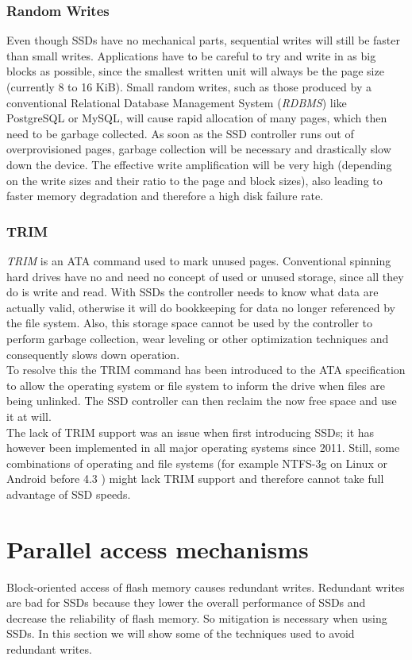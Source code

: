 \documentclass{acm_proc_article-sp}
\begin{document}
\subsubsection*{Random Writes}
Even though SSDs have no mechanical parts, sequential writes will still be faster than small writes. Applications have to be careful to try and write in as big blocks as possible, since the smallest written unit will always be the page size (currently 8 to 16 KiB). Small random writes, such as those produced by a conventional Relational Database Management System (\emph{RDBMS}) like PostgreSQL or MySQL, will cause rapid allocation of many pages, which then need to be garbage collected. As soon as the SSD controller runs out of overprovisioned pages, garbage collection will be necessary and drastically slow down the device. The effective write amplification will be very high (depending on the write sizes and their ratio to the page and block sizes), also leading to faster memory degradation and therefore a high disk failure rate.

\subsubsection*{TRIM}
\emph{TRIM} is an ATA command used to mark unused pages. Conventional spinning hard drives have no and need no concept of used or unused storage, since all they do is write and read. With SSDs the controller needs to know what data are actually valid, otherwise it will do bookkeeping for data no longer referenced by the file system. Also, this storage space cannot be used by the controller to perform garbage collection, wear leveling or other optimization techniques and consequently slows down operation.
\\
To resolve this the TRIM command has been introduced to the ATA specification to allow the operating system or file system to inform the drive when files are being unlinked. The SSD controller can then reclaim the now free space and use it at will.
\\
The lack of TRIM support was an issue when first introducing SSDs; it has however been implemented in all major operating systems since 2011. Still, some combinations of operating and file systems (for example NTFS-3g on Linux or Android before 4.3 \cite{androidtrim}) might lack TRIM support and therefore cannot take full advantage of SSD speeds.

\section{Parallel access mechanisms}
Block-oriented access of flash memory causes re\-dundant wri\-tes. Redundant writes are bad for SSDs because they lower the overall performance of SSDs and decrease the reliability of flash memory. So mitigation is necessary when using SSDs. In this section we will show some of the techniques used to avoid redundant writes.
\end{document}

